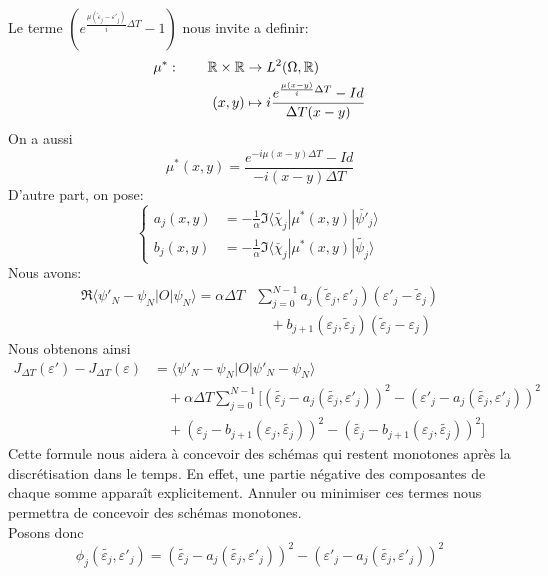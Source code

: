 Le terme $(e^{\frac{\mu(\tilde{\varepsilon}_j-\varepsilon'_j)}{i}\Delta T}-1)$ nous invite a definir:
\begin{equation} \label{mustar}
\begin{aligned}
\mu^* :\quad \quad \mathbb R \times \mathbb R &\rightarrow L^2(\Omega, \mathbb R) \\(x,y)&\mapsto i\dfrac{e^{\frac{\mu (x-y)}{i}\Delta T }-Id}{\Delta T (x-y)}
\end{aligned}
\end{equation}
On a aussi
\begin{equation*}
\mu^*(x,y)=\dfrac{e^{-i\mu (x-y)\Delta T }-Id}{-i(x-y)\Delta T}
\end{equation*}
D'autre part, on pose:
\begin{equation}
\begin{cases}
a_j(x,y) &=-\frac{1}{\alpha} \Im \langle \tilde{\chi_j}|\mu^*(x,y)|\breve{\psi'_j} \rangle \\
b_j(x,y) &= -\frac{1}{\alpha} \Im \langle \breve{\chi_j}|\mu^*(x,y)|\tilde{\psi_j} \rangle
\end{cases}
\end{equation}
Nous avons:
\begin{align*}
\Re \langle \psi'_N-\psi_N |O|\psi_N \rangle = \alpha \Delta T &\sum_{j=0}^{N-1} a_j (\tilde{\varepsilon}_j,\varepsilon'_j)(\varepsilon'_j- \tilde{\varepsilon}_j)\\
&\quad +b_{j+1} (\varepsilon_j,\tilde{\varepsilon}_j)(\tilde{\varepsilon}_j-\varepsilon_j)
\end{align*}
Nous obtenons ainsi
\begin{align*}
J_{\Delta T}(\varepsilon')-J_{\Delta T}(\varepsilon) &= \langle \psi'_N-\psi_N |O|\psi'_N-\psi_N \rangle \\
&\quad +\alpha \Delta T \sum_{j=0}^{N -1}[(\tilde{\varepsilon_j}-a_j(\tilde{\varepsilon_j},\varepsilon'_j))^2 - (\varepsilon'_j-a_j(\tilde{\varepsilon_j},\varepsilon'_j))^2\\
&\quad + (\varepsilon_j-b_{j+1}(\varepsilon_j,\tilde{\varepsilon_j}))^2 - (\tilde{\varepsilon_j}-b_{j+1}(\varepsilon_j,\tilde{\varepsilon_j}))^2]
\end{align*}
Cette formule nous aidera à concevoir des schémas qui restent monotones après la discrétisation dans le temps. En effet, une partie négative des composantes de chaque somme apparaît explicitement. Annuler ou minimiser ces termes nous permettra de concevoir des schémas monotones. \\
Posons donc
\begin{equation}
\phi_j(\tilde{\varepsilon_j},\varepsilon'_j) = (\tilde{\varepsilon_j}-a_j(\tilde{\varepsilon_j},\varepsilon'_j))^2 - (\varepsilon'_j-a_j(\tilde{\varepsilon_j},\varepsilon'_j))^2
\end{equation}
